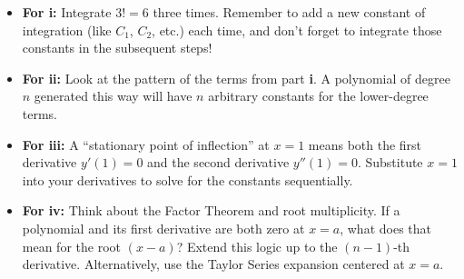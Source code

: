 \begin{hint}
\begin{itemize}
    \item \textbf{For i:} Integrate $3! = 6$ three times. Remember to add a new constant of integration (like $C_1$, $C_2$, etc.) each time, and don't forget to integrate those constants in the subsequent steps!
    \item \textbf{For ii:} Look at the pattern of the terms from part \textbf{i}. A polynomial of degree $n$ generated this way will have $n$ arbitrary constants for the lower-degree terms. 
    \item \textbf{For iii:} A ``stationary point of inflection'' at $x=1$ means both the first derivative $y'(1) = 0$ and the second derivative $y''(1) = 0$. Substitute $x=1$ into your derivatives to solve for the constants sequentially.
    \item \textbf{For iv:} Think about the Factor Theorem and root multiplicity. If a polynomial and its first derivative are both zero at $x=a$, what does that mean for the root $(x-a)$? Extend this logic up to the $(n-1)$-th derivative. Alternatively, use the Taylor Series expansion centered at $x=a$.
\end{itemize}
\end{hint}


